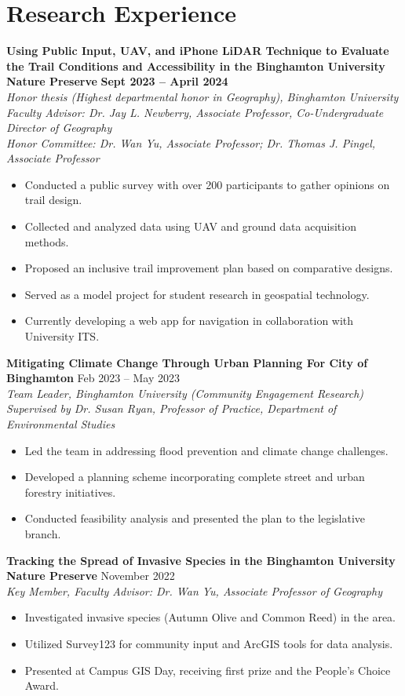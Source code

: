 \documentclass[11pt]{article}
\begin{document}
\section*{Research Experience}
\noindent
\textbf{Using Public Input, UAV, and iPhone LiDAR Technique to Evaluate the Trail Conditions and Accessibility in the Binghamton University Nature Preserve} \hfill \textbf{Sept 2023 -- April 2024} \\
\textit{Honor thesis (Highest departmental honor in Geography), Binghamton University} \\
\textit{Faculty Advisor: Dr. Jay L. Newberry, Associate Professor, Co-Undergraduate Director of Geography \\
Honor Committee: Dr. Wan Yu, Associate Professor; Dr. Thomas J. Pingel, Associate Professor}
\begin{itemize}[leftmargin=*]
    \item Conducted a public survey with over 200 participants to gather opinions on trail design.
    \item Collected and analyzed data using UAV and ground data acquisition methods.
    \item Proposed an inclusive trail improvement plan based on comparative designs.
    \item Served as a model project for student research in geospatial technology.
    \item Currently developing a web app for navigation in collaboration with University ITS.
\end{itemize}

\noindent
\textbf{Mitigating Climate Change Through Urban Planning For City of Binghamton} \hfill Feb 2023 -- May 2023 \\
\textit{Team Leader, Binghamton University (Community Engagement Research) \\
Supervised by Dr. Susan Ryan, Professor of Practice, Department of Environmental Studies}
\begin{itemize}[leftmargin=*]
    \item Led the team in addressing flood prevention and climate change challenges.
    \item Developed a planning scheme incorporating complete street and urban forestry initiatives.
    \item Conducted feasibility analysis and presented the plan to the legislative branch.
\end{itemize}

\noindent
\textbf{Tracking the Spread of Invasive Species in the Binghamton University Nature Preserve} \hfill November 2022 \\
\textit{Key Member, Faculty Advisor: Dr. Wan Yu, Associate Professor of Geography}
\begin{itemize}[leftmargin=*]
    \item Investigated invasive species (Autumn Olive and Common Reed) in the area.
    \item Utilized Survey123 for community input and ArcGIS tools for data analysis.
    \item Presented at Campus GIS Day, receiving first prize and the People's Choice Award.
\end{itemize}
\end{document}
